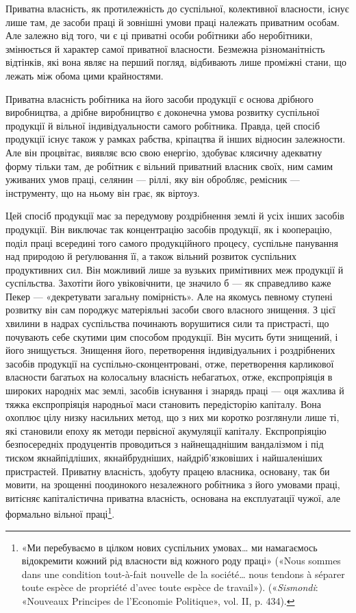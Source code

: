 
Приватна власність, як протилежність до суспільної, колективної
власности, існує лише там, де засоби праці й зовнішні
умови праці належать приватним особам. Але залежно від того,
чи є ці приватні особи робітники або неробітники, змінюється
й характер самої приватної власности. Безмежна різноманітність
відтінків, які вона являє на перший погляд, відбивають лише
проміжні стани, що лежать між обома цими крайностями.

Приватна власність робітника на його засоби продукції є
основа дрібного виробництва, а дрібне виробництво є доконечна
умова розвитку суспільної продукції й вільної індивідуальности
самого робітника. Правда, цей спосіб продукції існує також у
рамках рабства, кріпацтва й інших відносин залежности. Але
він процвітає, виявляє всю свою енергію, здобуває клясичну
адекватну форму тільки там, де робітник є вільний приватний
власник своїх, ним самим уживаних умов праці, селянин — ріллі,
яку він обробляє, ремісник — інструменту, що на ньому він грає,
як віртоуз.

Цей спосіб продукції має за передумову роздрібнення землі
й усіх інших засобів продукції. Він виключає так концентрацію
засобів продукції, як і кооперацію, поділ праці всередині того
самого продукційного процесу, суспільне панування над природою
й реґулювання її, а також вільний розвиток суспільних продуктивних
сил. Він можливий лише за вузьких примітивних
меж продукції й суспільства. Захотіти його увіковічнити, це
значило б — як справедливо каже Пекер — «декретувати
загальну помірність». Але на якомусь певному ступені розвитку
він сам породжує матеріяльні засоби свого власного знищення.
З цієї хвилини в надрах суспільства починають ворушитися
сили та пристрасті, що почувають себе скутими цим способом
продукції. Він мусить бути знищений, і його знищується. Знищення
його, перетворення індивідуальних і роздрібнених засобів
продукції на суспільно-сконцентровані, отже, перетворення
карликової власности багатьох на колосальну власність
небагатьох, отже, експропріяція в широких народніх мас землі,
засобів існування і знарядь праці — оця жахлива й тяжка
експропріяція народньої маси становить передісторію капіталу.
Вона охоплює цілу низку насильних метод, що з них ми коротко
розглянули лише ті, які становили епоху як методи первісної
акумуляції капіталу. Експропріяцію безпосередніх продуцентів
проводиться з найнещаднішим вандалізмом і під тиском
якнайпідліших, якнайбрудніших, найдріб’язковіших і найшаленіших
пристрастей. Приватну власність, здобуту працею власника,
основану, так би мовити, на зрощенні поодинокого незалежного
робітника з його умовами праці, витісняє капіталістична
приватна власність, основана на експлуатації чужої, але формально
вільної праці\footnote{
«Ми перебуваємо в цілком нових суспільних умовах\dots{} ми намагаємось
відокремити кожний рід власности від кожного роду праці»
(«Nous sommes dans une condition tout-à-fait nouvelle de la société\dots{}
nous tendons à séparer toute espèce de propriété d’avec toute espèce de
travail»). («\emph{Sismondi}: «Nouveaux Principes de l’Economie Politique»,
vol. II, p. 434).
}.

